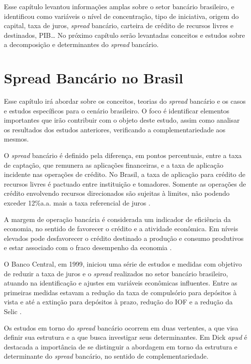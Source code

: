 \documentclass[12pt,openright,oneside,a4paper,chapter=TITLE,section=TITLE,subsection=Title,english,french,spanish,portugues,sumario=tradicional]{04-class-files/abntex2}
\begin{document}
Esse capítulo levantou informações amplas sobre o setor bancário brasileiro, e identificou como variáveis o nível de concentração, tipo de iniciativa, origem do capital, taxa de juros, \emph{spread} bancário, carteira de crédito de recursos livres e destinados, PIB\ldots{} No próximo capítulo serão levantadas conceitos e estudos sobre a decomposição e determinantes do \emph{spread} bancário.

\textual

\pagestyle{simple}

\chapter{Spread Bancário no Brasil}

Esse capítulo irá abordar sobre os conceitos, teorias do \emph{spread} bancário e os casos e estudos específicos para o cenário brasileiro. O foco é identificar elementos importantes que irão contribuir com o objeto deste estudo, assim como analisar os resultados dos estudos anteriores, verificando a complementariedade aos mesmos.

O \emph{spread} bancário é definido pela diferença, em pontos percentuais, entre a taxa de captação, que remunera as aplicações financeiras, e a taxa de aplicação incidente nas operações de crédito. No Brasil, a taxa de aplicação para crédito de recursos livres é pactuado entre instituição e tomadores. Somente as operações de crédito envolvendo recursos direcionados são sujeitas à limites, não podendo exceder 12\%a.a. mais a taxa referencial de juros \cite{BCB:2000}.

A margem de operação bancária é considerada um indicador de eficiência da economia, no sentido de favorecer o crédito e a atividade econômica. Em níveis elevados pode desfavorecer o crédito destinado a produção e consumo produtivos e estar associado com o fraco desempenho da economia \cite{WB:2005}.

O Banco Central, em 1999, iniciou uma série de estudos e medidas com objetivo de reduzir a taxa de juros e o \emph{spread} realizados no setor bancário brasileiro, atuando na identificação e ajustes em variáveis econômicas influentes. Entre as primeiras medidas estavam a redução da taxa de compulsório para depósitos à vista e até a extinção para depósitos à prazo, redução do IOF e a redução da Selic \cite{BCB:2000}.

Os estudos em torno do \emph{spread} bancário ocorrem em duas vertentes, a que visa definir sua estrutura e a que busca investigar seus determinantes. Em Dick \emph{apud} \cite{leal:2006} é destacada a importância de se distinguir a abordagem em torno da estrutura e determinante do \emph{spread} bancário, no sentido de complementariedade.
\end{document}
